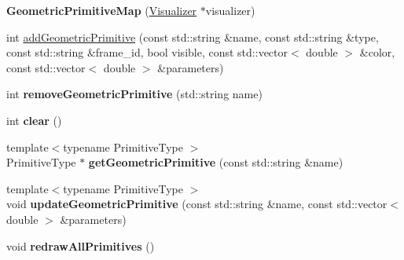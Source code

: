 \begin{DoxyCompactItemize}
\item 
\hypertarget{classhiqp_1_1geometric__primitives_1_1GeometricPrimitiveMap_ae59d213ebfa9f3d22678e048928cf565}{{\bfseries Geometric\-Primitive\-Map} (\hyperlink{classhiqp_1_1Visualizer}{Visualizer} $\ast$visualizer)}\label{classhiqp_1_1geometric__primitives_1_1GeometricPrimitiveMap_ae59d213ebfa9f3d22678e048928cf565}

\item 
int \hyperlink{classhiqp_1_1geometric__primitives_1_1GeometricPrimitiveMap_a6ddc5d3b4e8e44748fbb0c9e66957952}{add\-Geometric\-Primitive} (const std\-::string \&name, const std\-::string \&type, const std\-::string \&frame\-\_\-id, bool visible, const std\-::vector$<$ double $>$ \&color, const std\-::vector$<$ double $>$ \&parameters)
\item 
\hypertarget{classhiqp_1_1geometric__primitives_1_1GeometricPrimitiveMap_a07d04c1a3bb164bb501bd03cc6bc1eae}{int {\bfseries remove\-Geometric\-Primitive} (std\-::string name)}\label{classhiqp_1_1geometric__primitives_1_1GeometricPrimitiveMap_a07d04c1a3bb164bb501bd03cc6bc1eae}

\item 
\hypertarget{classhiqp_1_1geometric__primitives_1_1GeometricPrimitiveMap_aed92b78b51ccd075d226b003f9576476}{int {\bfseries clear} ()}\label{classhiqp_1_1geometric__primitives_1_1GeometricPrimitiveMap_aed92b78b51ccd075d226b003f9576476}

\item 
\hypertarget{classhiqp_1_1geometric__primitives_1_1GeometricPrimitiveMap_a51ccc8c0ff1434c8b8d1bcc2d0d9bbbf}{{\footnotesize template$<$typename Primitive\-Type $>$ }\\Primitive\-Type $\ast$ {\bfseries get\-Geometric\-Primitive} (const std\-::string \&name)}\label{classhiqp_1_1geometric__primitives_1_1GeometricPrimitiveMap_a51ccc8c0ff1434c8b8d1bcc2d0d9bbbf}

\item 
\hypertarget{classhiqp_1_1geometric__primitives_1_1GeometricPrimitiveMap_a844d0776ad4465b25825d91d2eb1f38a}{{\footnotesize template$<$typename Primitive\-Type $>$ }\\void {\bfseries update\-Geometric\-Primitive} (const std\-::string \&name, const std\-::vector$<$ double $>$ \&parameters)}\label{classhiqp_1_1geometric__primitives_1_1GeometricPrimitiveMap_a844d0776ad4465b25825d91d2eb1f38a}

\item 
\hypertarget{classhiqp_1_1geometric__primitives_1_1GeometricPrimitiveMap_a401b6481e8e08e26466dbd06c8b62ee5}{void {\bfseries redraw\-All\-Primitives} ()}\label{classhiqp_1_1geometric__primitives_1_1GeometricPrimitiveMap_a401b6481e8e08e26466dbd06c8b62ee5}


\end{DoxyCompactItemize}
